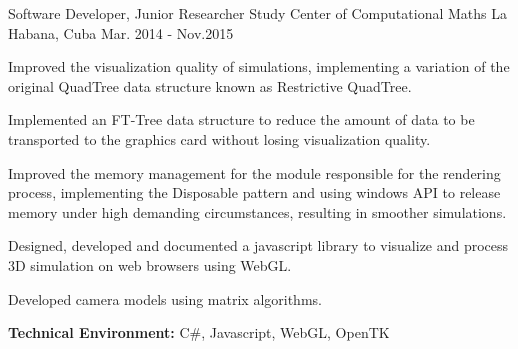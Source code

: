 \begin{cventries}
\workexperienceentry
{Software Developer, Junior Researcher} %
{Study Center of Computational Maths} %
{La Habana, Cuba} %
{Mar. 2014 - Nov.2015} %
{ %
\begin{cvitems}
	\item {Improved the visualization quality of simulations, implementing a variation of the original QuadTree data structure known as Restrictive QuadTree.}
	\item {Implemented an FT-Tree data structure to reduce the amount of data to be transported to the graphics card without losing visualization quality.}
	\item {Improved the memory management for the module responsible for the rendering process, implementing the Disposable pattern and using windows API to release memory under high demanding circumstances, resulting in smoother simulations.}
	\item {Designed, developed and documented a javascript library to visualize and process 3D simulation on web browsers
	using WebGL.}
	\item {Developed camera models using matrix algorithms.}
\end{cvitems}
}
{\textbf{Technical Environment:} C\#, Javascript, WebGL, OpenTK}
\end{cventries}